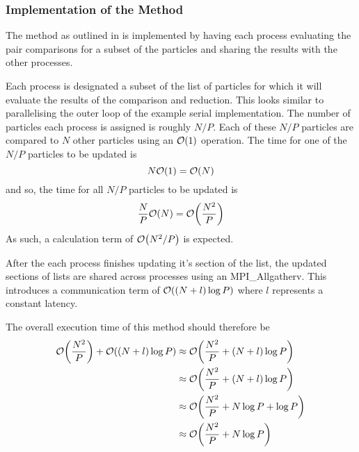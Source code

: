 %
%

\subsubsection{Implementation of the \pairoperation{} Method}

The \pairoperation{} method as outlined in
is implemented by having each process evaluating the pair
comparisons for a subset of the particles and sharing the
results with the other processes.

Each process is designated a subset of the list of particles for which
it will evaluate the results of the comparison and reduction.
%
This looks similar to parallelising the outer loop of the example
serial implementation.
%
The number of particles each process is assigned is roughly $N/P$.
%
Each of these $N/P$ particles are compared to $N$ other particles
using an $\mathcal{O}{\left({ 1 }\right)}$ operation.
%
The time for one of the $N/P$ particles to be updated is
\begin{equation}
    N\mathcal{O}{\left({ 1 }\right)} = \mathcal{O}{\left({ N }\right)}
\end  {equation}
and so, the time for all $N/P$ particles to be updated is
\begin{equation}
    \frac{N}{P}\mathcal{O}{\left({ N }\right)} = \mathcal{O}{\left({ \frac{N^2}{P} }\right)}
\end  {equation}
As such, a calculation term of $\mathcal{O}{\left({ N^2/P }\right)}$ is expected.

After the each process finishes updating it's section of the list,
the updated sections of lists are shared across processes using
an MPI\_Allgatherv.
This introduces a communication term of $\mathcal{O}{\left({ (N + l)\log{P} }\right)}$
where $l$ represents a constant latency.

The overall execution time of this method should therefore be
\begin{align}
    \mathcal{O}{\left({ \frac{N^2}{P} }\right)} + \mathcal{O}{\left({ (N+l)\log{P} }\right)}
        &\approx{} \mathcal{O}{\left({ \frac{N^2}{P} + (N+l)\log{P} }\right)} \\
        &\approx{} \mathcal{O}{\left({ \frac{N^2}{P} + (N+l)\log{P} }\right)} \\
        &\approx{} \mathcal{O}{\left({ \frac{N^2}{P} + N\log{P} + \log{P} }\right)} \\
        \label{eqn:v0_replicated_pair_operation_overall_time}
        &\approx{} \mathcal{O}{\left({ \frac{N^2}{P} + N\log{P} }\right)}
\end  {align}

\begin{figure}[!h]
    
    \caption{}
    \label{fig:v0_replicated_pair_operation_512_logtime}
\end  {figure}


